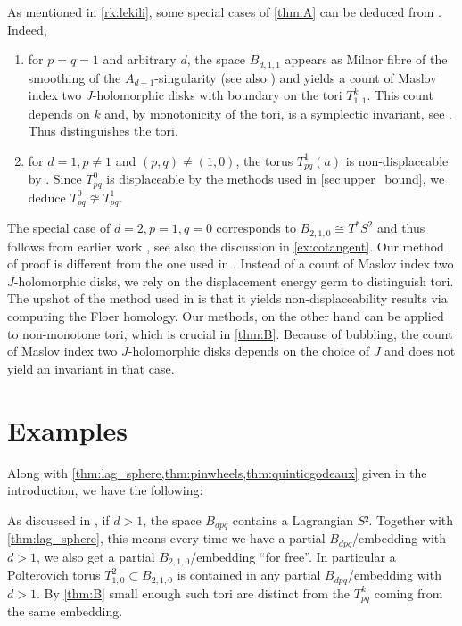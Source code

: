\documentclass[AIF,Unicode,manuscript]{cedram}
\begin{document}
\begin{remark}
    \label{rk:lekili2}
    As mentioned in \cref{rk:lekili}, some special cases of \cref{thm:A} can be deduced from \cite{LekMay14}. Indeed, 
    \begin{enumerate}
        \item for $p = q = 1$ and arbitrary $d$, the space $B_{d,1,1}$ appears as Milnor fibre of the smoothing of the $A_{d-1}$-singularity (see also \cite[Section 7.3]{evans2021atfs}) and \cite[Lemma 2.19]{LekMay14} yields a count of Maslov index two $J$-holomorphic disks with boundary on the tori $T^k_{1,1}$. This count depends on $k$ and, by monotonicity of the tori, is a symplectic invariant, see \cite{EliPol97}. Thus \cite[Lemma 2.19]{LekMay14} distinguishes the tori.
        \item for $d = 1,p \neq 1$ and $(p,q) ≠ (1,0)$, the torus $T^1_{pq}(a)$ is non-displaceable by \cite[Proposition 3.6]{LekMay14}.
        Since $T^0_{pq}$ is displaceable by the methods used in \cref{sec:upper_bound}, we deduce $T^0_{pq} \ncong T^1_{pq}$.
    \end{enumerate}
    The special case of $d=2,p=1,q=0$ corresponds to $B_{2,1,0} \cong T^*S^2$ and thus follows from earlier work \cite{AlbFra08}, see also the discussion in \cref{ex:cotangent}.
    Our method of proof is different from the one used in \cite{LekMay14}.
    Instead of a count of Maslov index two $J$-holomorphic disks, we rely on the displacement energy germ to distinguish tori.
    The upshot of the method used in \cite{LekMay14} is that it yields non-displaceability results via computing the Floer homology.
    Our methods, on the other hand can be applied to non-monotone tori, which is crucial in \cref{thm:B}. Because of bubbling, the count of Maslov index two $J$-holomorphic disks depends on the choice of $J$ and does not yield an invariant in that case.
\end{remark}

\section{Examples}
\label{sec:examples}

Along with \cref{thm:lag_sphere,thm:pinwheels,thm:quinticgodeaux} given in the introduction, we have the following:

As discussed in \cite[Remark 7.10]{evans2021atfs}, if $d>1$, the space $B_{dpq}$ contains a Lagrangian $S²$.
Together with \cref{thm:lag_sphere}, this means every time we have a partial $B_{dpq}$\-/embedding with $d>1$, we also get a partial $B_{2,1,0}$\-/embedding ``for free''.
In particular a Polterovich torus $T^2_{1,0} ⊂ B_{2,1,0}$ is contained in any partial $B_{dpq}$\-/embedding with $d>1$.
By \cref{thm:B} small enough such tori are distinct from the $T_{pq}^k$ coming from the same embedding.
\end{document}
